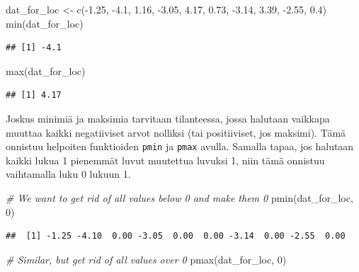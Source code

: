 \documentclass[
]{book}
\newenvironment{Shaded}{\begin{snugshade}}{\end{snugshade}}
\newcommand{\CommentTok}[1]{\textcolor[rgb]{0.56,0.35,0.01}{\textit{#1}}}
\newcommand{\DecValTok}[1]{\textcolor[rgb]{0.00,0.00,0.81}{#1}}
\newcommand{\FloatTok}[1]{\textcolor[rgb]{0.00,0.00,0.81}{#1}}
\newcommand{\FunctionTok}[1]{\textcolor[rgb]{0.00,0.00,0.00}{#1}}
\newcommand{\NormalTok}[1]{#1}
\newcommand{\OtherTok}[1]{\textcolor[rgb]{0.56,0.35,0.01}{#1}}
\newcommand{\SpecialCharTok}[1]{\textcolor[rgb]{0.00,0.00,0.00}{#1}}
\begin{document}
\begin{Shaded}
\begin{Highlighting}[]
\NormalTok{dat\_for\_loc }\OtherTok{\textless{}{-}} \FunctionTok{c}\NormalTok{(}\SpecialCharTok{{-}}\FloatTok{1.25}\NormalTok{, }\SpecialCharTok{{-}}\FloatTok{4.1}\NormalTok{, }\FloatTok{1.16}\NormalTok{, }\SpecialCharTok{{-}}\FloatTok{3.05}\NormalTok{, }\FloatTok{4.17}\NormalTok{, }\FloatTok{0.73}\NormalTok{, }\SpecialCharTok{{-}}\FloatTok{3.14}\NormalTok{, }\FloatTok{3.39}\NormalTok{, }\SpecialCharTok{{-}}\FloatTok{2.55}\NormalTok{, }\FloatTok{0.4}\NormalTok{)}
\FunctionTok{min}\NormalTok{(dat\_for\_loc)}
\end{Highlighting}
\end{Shaded}

\begin{verbatim}
## [1] -4.1
\end{verbatim}

\begin{Shaded}
\begin{Highlighting}[]
\FunctionTok{max}\NormalTok{(dat\_for\_loc)}
\end{Highlighting}
\end{Shaded}

\begin{verbatim}
## [1] 4.17
\end{verbatim}

Joskus minimiä ja maksimia tarvitaan tilanteessa, jossa halutaan vaikkapa muuttaa kaikki negatiiviset arvot nolliksi (tai positiiviset, jos maksimi). Tämä onnistuu helpoiten funktioiden \texttt{pmin} ja \texttt{pmax} avulla. Samalla tapaa, jos halutaan kaikki lukua 1 pienemmät luvut muutettua luvuksi 1, niin tämä onnistuu vaihtamalla luku 0 lukuun 1.

\begin{Shaded}
\begin{Highlighting}[]
\CommentTok{\# We want to get rid of all values below 0 and make them 0}
\FunctionTok{pmin}\NormalTok{(dat\_for\_loc, }\DecValTok{0}\NormalTok{)}
\end{Highlighting}
\end{Shaded}

\begin{verbatim}
##  [1] -1.25 -4.10  0.00 -3.05  0.00  0.00 -3.14  0.00 -2.55  0.00
\end{verbatim}

\begin{Shaded}
\begin{Highlighting}[]
\CommentTok{\# Similar, but get rid of all values over 0}
\FunctionTok{pmax}\NormalTok{(dat\_for\_loc, }\DecValTok{0}\NormalTok{)}
\end{Highlighting}
\end{Shaded}
\end{document}
